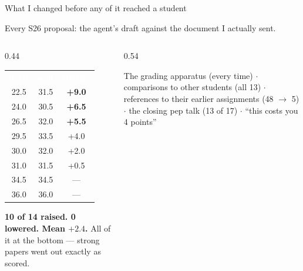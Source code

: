 \documentclass[aspectratio=169, 10pt]{beamer}
\begin{document}
\begin{frame}{What I changed before any of it reached a student}
\vskip-6pt
{\footnotesize Every S26 proposal: the agent's draft against the document I actually sent.\par}
\vskip1pt
\begin{columns}[T]
\begin{column}{0.44\textwidth}
\begin{tcolorbox}[keybox, title={\faBalanceScale\quad Its score, then mine}, top=2pt, bottom=3pt]
\scriptsize
\setlength{\tabcolsep}{4pt}\renewcommand{\arraystretch}{1.08}
\begin{tabular}{c c c}
\rowcolor{SlateTeal}
\textcolor{white}{\textbf{draft}} & \textcolor{white}{\textbf{sent}} & \textcolor{white}{\textbf{change}} \\
\rowcolor{LightGold} 22.5 & 31.5 & \textbf{+9.0} \\
\rowcolor{LightGold} 24.0 & 30.5 & \textbf{+6.5} \\
\rowcolor{LightGold} 26.5 & 32.0 & \textbf{+5.5} \\
\rowcolor{white}     29.5 & 33.5 & +4.0 \\
\rowcolor{PaleSage}  30.0 & 32.0 & +2.0 \\
\rowcolor{white}     31.0 & 31.5 & +0.5 \\
\rowcolor{PaleSage}  34.5 & 34.5 & --- \\
\rowcolor{white}     36.0 & 36.0 & --- \\
\end{tabular}
\end{tcolorbox}
\vskip3pt
\begin{tcolorbox}[accentbox, top=1pt, bottom=1pt]
\scriptsize \textbf{10 of 14 raised. 0 lowered. Mean $+2.4$.} All of it at the bottom --- strong papers went out exactly as scored.
\end{tcolorbox}
\end{column}
\begin{column}{0.54\textwidth}
\begin{tcolorbox}[dontbox, title={\faCut\quad What I cut}, top=1pt, bottom=1pt, fonttitle=\bfseries\scriptsize]
\scriptsize
The grading apparatus (every time) $\cdot$ comparisons to other students (all 13) $\cdot$ references to their earlier assignments (48 $\rightarrow$ 5) $\cdot$ the closing pep talk (13 of 17) $\cdot$ ``this costs you 4 points''
\end{tcolorbox}
\vskip3pt
\begin{tcolorbox}[dobox, title={\faPlus\quad What I added}, top=1pt, bottom=1pt, fonttitle=\bfseries\scriptsize]

\end{tcolorbox}
\end{column}
\end{columns}
\end{frame}
\end{document}
